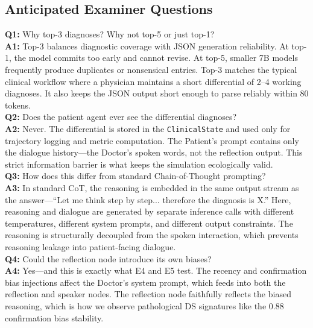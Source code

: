 \documentclass[12pt]{article}
\begin{document}
  \subsection*{Anticipated Examiner Questions}
  \begin{qabox}
  \textbf{Q1:} Why top-3 diagnoses? Why not top-5 or just top-1? \\
  \textbf{A1:} Top-3 balances diagnostic coverage with JSON generation reliability. At top-1, the model commits too early and cannot revise. At top-5, smaller 7B models frequently produce duplicates or nonsensical entries. Top-3 matches the typical clinical workflow where a physician maintains a short differential of 2--4 working diagnoses. It also keeps the JSON output short enough to parse reliably within 80 tokens. \\[6pt]
  \textbf{Q2:} Does the patient agent ever see the differential diagnoses? \\
  \textbf{A2:} Never. The differential is stored in the \texttt{ClinicalState} and used only for trajectory logging and metric computation. The Patient's prompt contains only the dialogue history---the Doctor's spoken words, not the reflection output. This strict information barrier is what keeps the simulation ecologically valid. \\[6pt]
  \textbf{Q3:} How does this differ from standard Chain-of-Thought prompting? \\
  \textbf{A3:} In standard CoT, the reasoning is embedded in the same output stream as the answer---``Let me think step by step... therefore the diagnosis is X.'' Here, reasoning and dialogue are generated by separate inference calls with different temperatures, different system prompts, and different output constraints. The reasoning is structurally decoupled from the spoken interaction, which prevents reasoning leakage into patient-facing dialogue. \\[6pt]
  \textbf{Q4:} Could the reflection node introduce its own biases? \\
  \textbf{A4:} Yes---and this is exactly what E4 and E5 test. The recency and confirmation bias injections affect the Doctor's system prompt, which feeds into both the reflection and speaker nodes. The reflection node faithfully reflects the biased reasoning, which is how we observe pathological DS signatures like the 0.88 confirmation bias stability.
  \end{qabox}




\end{document}
